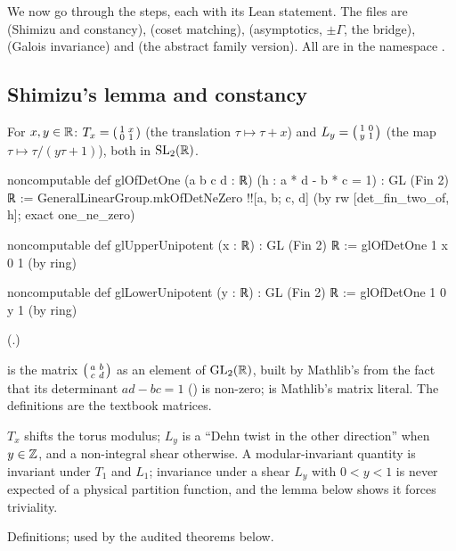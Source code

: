 We now go through the steps, each with its Lean statement.  The files are
 (Shimizu and constancy),
 (coset matching),
 (asymptotics, $\pm\Gamma$, the bridge),
 (Galois invariance) and
 (the abstract family version).  All are in the namespace
.

\subsection{Shimizu's lemma and constancy}

\begin{definition}\label{ch16:def:unipotent}
For $x,y\in\mathbb{R}$: $T_x=\left(\begin{smallmatrix}1&x\\0&1\end{smallmatrix}\right)$ (the translation $\tau\mapsto\tau+x$) and $L_y=\left(\begin{smallmatrix}1&0\\y&1\end{smallmatrix}\right)$ (the map
$\tau\mapsto\tau/(y\tau+1)$), both in $\mathrm{SL}_2(\mathbb{R})$.
\end{definition}
\begin{leancode}
noncomputable def glOfDetOne (a b c d : ℝ) (h : a * d - b * c = 1) : GL (Fin 2) ℝ :=
  GeneralLinearGroup.mkOfDetNeZero !![a, b; c, d] (by rw [det_fin_two_of, h]; exact one_ne_zero)

noncomputable def glUpperUnipotent (x : ℝ) : GL (Fin 2) ℝ := glOfDetOne 1 x 0 1 (by ring)

noncomputable def glLowerUnipotent (y : ℝ) : GL (Fin 2) ℝ := glOfDetOne 1 0 y 1 (by ring)
\end{leancode}
(.)
\begin{dictionary}
 is the matrix $\left(\begin{smallmatrix}a&b\\c&d\end{smallmatrix}\right)$ as an element of $\mathrm{GL}_2(\mathbb{R})$, built by Mathlib's
 from the fact that its determinant $ad-bc=1$ () is non-zero;
\lean{!![a, b; c, d]} is Mathlib's matrix literal.  The definitions are the textbook
matrices.
\end{dictionary}
\begin{physics}
$T_x$ shifts the torus modulus; $L_y$ is a ``Dehn twist in the other direction'' when $y\in{\mathbb{Z}}$, and a non-integral
shear otherwise.  A modular-invariant quantity is invariant under $T_1$ and $L_1$; invariance under a shear $L_y$
with $0<y<1$ is never expected of a physical partition function, and the lemma below shows it forces triviality.
\end{physics}
\begin{status}
Definitions; used by the audited theorems below.
\end{status}

